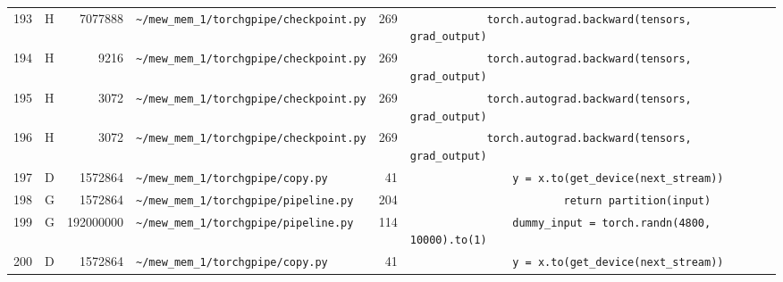 \documentclass{article}
\begin{document}
\begin{longtable}{r l r p{6.5cm} r p{7.0cm}}
193 & H & 7077888 & \lstinline|~/mew_mem_1/torchgpipe/checkpoint.py| & 269 & \lstinline|            torch.autograd.backward(tensors, grad_output)| \\
194 & H & 9216 & \lstinline|~/mew_mem_1/torchgpipe/checkpoint.py| & 269 & \lstinline|            torch.autograd.backward(tensors, grad_output)| \\
195 & H & 3072 & \lstinline|~/mew_mem_1/torchgpipe/checkpoint.py| & 269 & \lstinline|            torch.autograd.backward(tensors, grad_output)| \\
196 & H & 3072 & \lstinline|~/mew_mem_1/torchgpipe/checkpoint.py| & 269 & \lstinline|            torch.autograd.backward(tensors, grad_output)| \\
197 & D & 1572864 & \lstinline|~/mew_mem_1/torchgpipe/copy.py| & 41 & \lstinline|                y = x.to(get_device(next_stream))| \\
198 & G & 1572864 & \lstinline|~/mew_mem_1/torchgpipe/pipeline.py| & 204 & \lstinline|                        return partition(input)| \\
199 & G & 192000000 & \lstinline|~/mew_mem_1/torchgpipe/pipeline.py| & 114 & \lstinline|                dummy_input = torch.randn(4800, 10000).to(1)| \\
200 & D & 1572864 & \lstinline|~/mew_mem_1/torchgpipe/copy.py| & 41 & \lstinline|                y = x.to(get_device(next_stream))| \\
\end{longtable}
\end{document}
